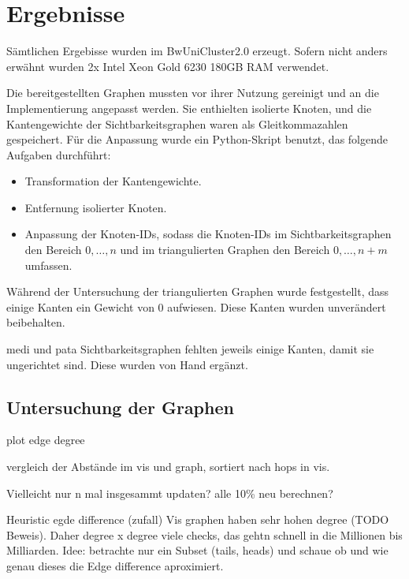 \chapter{Ergebnisse}

Sämtlichen Ergebisse wurden im BwUniCluster2.0 erzeugt. Sofern nicht anders erwähnt wurden
2x Intel Xeon Gold 6230
180GB RAM verwendet.


Die bereitgestellten Graphen mussten vor ihrer Nutzung gereinigt und an die Implementierung angepasst werden.
Sie enthielten isolierte Knoten, und die Kantengewichte der Sichtbarkeitsgraphen waren als Gleitkommazahlen gespeichert.
Für die Anpassung wurde ein Python-Skript benutzt, das folgende Aufgaben durchführt:

\begin{itemize}
    \item
          Transformation der Kantengewichte.

    \item
          Entfernung isolierter Knoten.

    \item
          Anpassung der Knoten-IDs, sodass die Knoten-IDs im Sichtbarkeitsgraphen den Bereich $0, \dotsc, n$ und im triangulierten Graphen den Bereich $0, \dotsc, n + m$ umfassen.
\end{itemize}

Während der Untersuchung der triangulierten Graphen wurde festgestellt, dass einige Kanten ein Gewicht von 0 aufwiesen.
Diese Kanten wurden unverändert beibehalten.

medi und pata Sichtbarkeitsgraphen fehlten jeweils einige Kanten, damit sie ungerichtet sind.
Diese wurden von Hand ergänzt.


\section{Untersuchung der Graphen}

plot edge degree

vergleich der Abstände im vis und graph, sortiert nach hops in vis.




Vielleicht nur n mal insgesammt updaten? alle 10\% neu berechnen?



Heuristic egde difference (zufall)
Vis graphen haben sehr hohen degree (TODO Beweis).
Daher degree x degree viele checks, das gehtn schnell in die Millionen bis Milliarden.
Idee: betrachte nur ein Subset (tails, heads) und schaue ob und wie genau dieses die Edge difference aproximiert.

